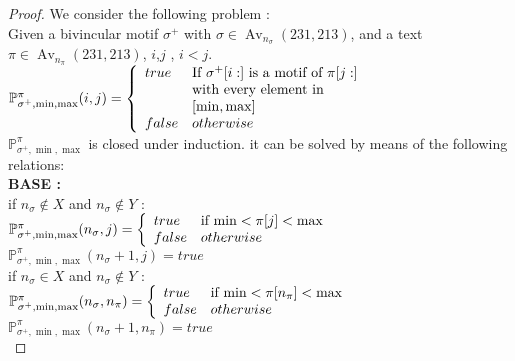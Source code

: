 \documentclass[a4paper]{llncs}
\DeclareMathOperator{\Avd}{Av}
\newcommand\Av[2]{\Avd_{{#1}}({#2})}
\newcommand{\ptext}{\pi}
\newcommand{\pmotif}{\sigma}
\newcommand{\x}{X}
\newcommand{\y}{Y}
\newcommand{\pbmotif}{\pmotif^+}
\begin{document}
			\begin{proof}
			We consider the following problem :\\
			
			Given a bivincular motif $\pbmotif$ with $\pmotif \in \Av{n_\pmotif}{231,213} $, and a text $\ptext \in \Av{n_\ptext}{231,213}$, $i$,$j$ , $i<j$.\\
			
			$\mathbb{P}_{\pbmotif,\min,\max}^{\ptext}(i,j)= \left\{ 
				\begin{array}{l l}
					true & \text{If $\pbmotif[i:]$ is a motif of $\ptext[j:]$}\\
						& \text{with every element in}\\ 
						&[\min,\max]\\
		
					false & otherwise\\
				\end{array} \right.$\\
		
		
		
		
			$\mathbb{P}_{\pbmotif,\min,\max}^{\ptext}$ is closed under induction. 
			it can be
			solved by means of the following relations:\\
			
			
			\textbf{BASE :} \\
			
			if $n_\pmotif \notin  \x $
			and $n_\pmotif \notin  \y$ : \\		
			$\mathbb{P}_{\pbmotif,\min,\max}^{\ptext}(n_\pmotif,j)= \left\{ 
					\begin{array}{l l}
						true & \text{if $\min<\ptext[j]<\max$
						}\\
						false & otherwise\\
					\end{array} \right. $\\	
			$\mathbb{P}_{\pbmotif,\min,\max}^{\ptext}(n_\pmotif+1,j)= true $\\
			
			if $n_\pmotif \in  \x $
			and $n_\pmotif \notin  \y$ : \\		
			$\mathbb{P}_{\pbmotif,\min,\max}^{\ptext}(n_\pmotif,n_\ptext)= \left\{ 
					\begin{array}{l l}
						true & \text{if $\min<\ptext[n_\ptext]<\max$
						}\\
						false & otherwise\\
					\end{array} \right. $\\	
			$\mathbb{P}_{\pbmotif,\min,\max}^{\ptext}(n_\pmotif+1,n_\ptext)= true $\\
			

\end{proof}
\end{document}
